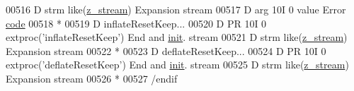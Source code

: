 \begin{DoxyCode}
00516      D  strm                               like(\hyperlink{structz__stream__s}{z\_stream})                       Expansion stream
00517      D  arg                          10I 0 value                                Error 
      \hyperlink{structcode}{code}
00518       *
00519      D inflateResetKeep...
00520      D                 PR            10I 0 extproc('inflateResetKeep')          End and 
      \hyperlink{structinit}{init}. stream
00521      D  strm                               like(\hyperlink{structz__stream__s}{z\_stream})                       Expansion stream
00522       *
00523      D deflateResetKeep...
00524      D                 PR            10I 0 extproc('deflateResetKeep')          End and 
      \hyperlink{structinit}{init}. stream
00525      D  strm                               like(\hyperlink{structz__stream__s}{z\_stream})                       Expansion stream
00526       *
00527       /endif
\end{DoxyCode}
